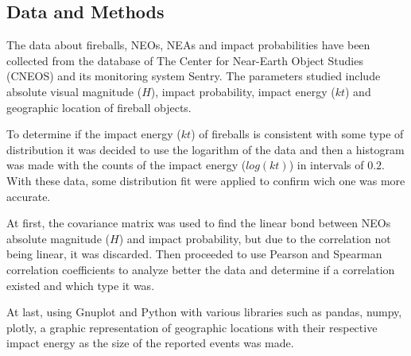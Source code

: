 \documentclass[a1,portrait]{a1poster}
\begin{document}
\begin{multicols}{2}

\color{Black} %

\section*{Data and Methods}

The data about fireballs, NEOs, NEAs and impact probabilities have been collected from the database of
The Center for Near-Earth Object Studies (CNEOS) and its monitoring system Sentry. The parameters
studied include absolute visual magnitude ($H$), impact probability, impact energy ($kt$) and
geographic location of fireball objects.

To determine if the impact energy ($kt$) of fireballs is consistent with some type of distribution it
was decided to use the logarithm of the data and then a histogram was made with the counts of the
impact energy ($log(kt)$) in intervals of $0.2$. With these data, some distribution fit were applied
to confirm wich one was more accurate.

At first, the covariance matrix was used to find the linear bond between NEOs absolute magnitude ($H$)
and impact probability, but due to the correlation not being linear, it was discarded. Then proceeded
to use Pearson and Spearman correlation coefficients to analyze better the data and determine if a
correlation existed and which type it was.

At last, using Gnuplot and Python with various libraries such as pandas, numpy, plotly, a graphic
representation of geographic locations with their respective impact energy as the size of the reported
events was made.





\end{multicols}
\end{document}
